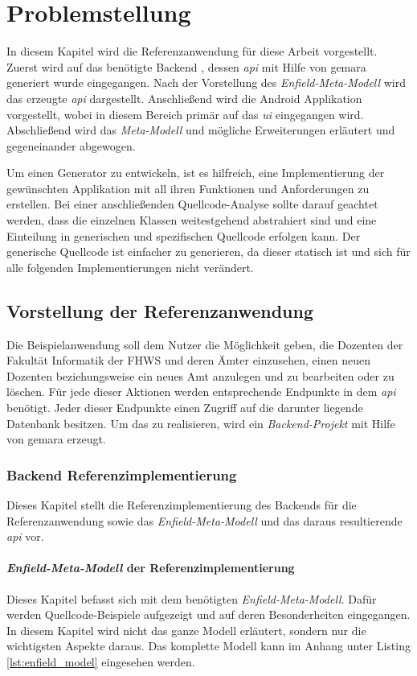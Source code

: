 \chapter{Problemstellung} \label{ch:problem}
In diesem Kapitel wird die Referenzanwendung für diese Arbeit vorgestellt. Zuerst wird auf das benötigte Backend , dessen \textit{\acf{api}} mit Hilfe von \acf{gemara} generiert wurde eingegangen. 
Nach der Vorstellung des \textit{Enfield-Meta-Modell} wird das erzeugte \textit{\acf{api}} dargestellt. Anschließend wird die Android Applikation vorgestellt, wobei in diesem Bereich primär auf das \textit{\acf{ui}} eingegangen wird. Abschließend wird das \textit{Meta-Modell} und mögliche Erweiterungen erläutert und gegeneinander abgewogen.

Um einen Generator zu entwickeln, ist es hilfreich, eine Implementierung der gewünschten Applikation mit all ihren Funktionen und Anforderungen zu erstellen. Bei einer anschließenden Quellcode-Analyse sollte darauf geachtet werden, dass die einzelnen Klassen weitestgehend abstrahiert sind und eine Einteilung in generischen und spezifischen Quellcode erfolgen kann. Der generische Quellcode ist einfacher zu generieren, da dieser statisch ist und sich für alle folgenden Implementierungen nicht verändert. 

\section{Vorstellung der Referenzanwendung}
Die Beispielanwendung soll dem Nutzer die Möglichkeit geben, die Dozenten der Fakultät Informatik der FHWS und deren Ämter einzusehen, einen neuen Dozenten beziehungsweise ein neues Amt anzulegen und zu bearbeiten oder zu löschen. Für jede dieser Aktionen werden entsprechende Endpunkte in dem \textit{\acf{api}} benötigt. Jeder dieser Endpunkte einen Zugriff auf die darunter liegende Datenbank besitzen. Um das zu realisieren, wird ein \textit{Backend-Projekt} mit Hilfe von \ac{gemara} erzeugt.

\newpage

\subsection{Backend Referenzimplementierung}
Dieses Kapitel stellt die Referenzimplementierung des Backends für die Referenzanwendung sowie das \textit{Enfield-Meta-Modell} und das daraus resultierende \textit{\acf{api}} vor.


\subsubsection{\textit{Enfield-Meta-Modell} der Referenzimplementierung} \label{sec:enfield_intro}
Dieses Kapitel befasst sich mit dem benötigten \textit{Enfield-Meta-Modell}. Dafür werden Quellcode-Beispiele aufgezeigt und auf deren Besonderheiten eingegangen. In diesem Kapitel wird nicht das ganze Modell erläutert, sondern nur die wichtigsten Aspekte daraus. Das komplette Modell kann im Anhang unter Listing \ref{lst:enfield_model} eingesehen werden.

